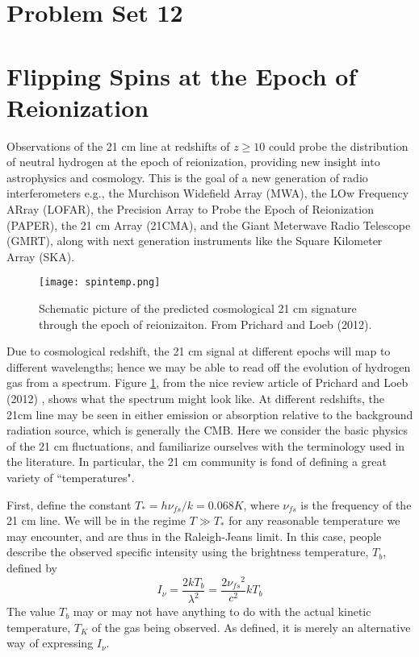 \documentclass[11pt]{article}
\begin{document}
\pagestyle{empty}

\def\nufs{{\nu_{fs}}}
\section*{\centering Problem Set 12}

\section{Flipping Spins at the Epoch of Reionization}

Observations of the 21 cm line at redshifts of $z\ge10$ could probe the
distribution of neutral hydrogen at the epoch of reionization, providing new
insight into astrophysics and cosmology. This is the goal of a new generation
of radio interferometers e.g., the Murchison Widefield Array (MWA), the LOw
Frequency ARray (LOFAR), the Precision Array to Probe the Epoch of Reionization
(PAPER), the 21 cm Array (21CMA), and the Giant Meterwave Radio Telescope
(GMRT), along with next generation instruments like the Square Kilometer Array
(SKA).

\begin{figure}[!ht]
\texttt{[image: spintemp.png]}
\caption{
Schematic picture of the predicted cosmological 21 cm signature through the
epoch of reionizaiton. From Prichard and Loeb (2012).
}\label{fig:spintemp}
\end{figure}

Due to cosmological redshift, the 21 cm signal at different epochs will map to
different wavelengths; hence we may be able to read off the evolution of
hydrogen gas from a spectrum. Figure \ref{fig:spintemp}, from the nice review article of
Prichard and Loeb (2012) , shows what the spectrum might look like. At
different redshifts, the 21cm line may be seen in either emission or absorption
relative to the background radiation source, which is generally the CMB. Here
we consider the basic physics of the 21 cm fluctuations, and familiarize
ourselves with the terminology used in the literature. In particular, the 21 cm
community is fond of defining a great variety of ``temperatures".

First, define the constant $T_*=h\nufs/k=0.068 K$, where $\nufs$ is the
frequency of the 21 cm line. We will be in the regime $T\gg T_*$ for any reasonable
temperature we may encounter, and are thus in the Raleigh-Jeans limit. In this
case, people describe the observed specific intensity using the brightness
temperature, $T_b$, defined by
\begin{equation}
I_\nu=\frac{2kT_b}{\lambda^2}=\frac{2\nufs^2}{c^2}kT_b
\end{equation}
The value $T_b$ may or may not have anything to do with the actual kinetic
temperature, $T_K$ of the gas being observed. As defined, it is merely an
alternative way of expressing $I_\nu$.
\end{document}
